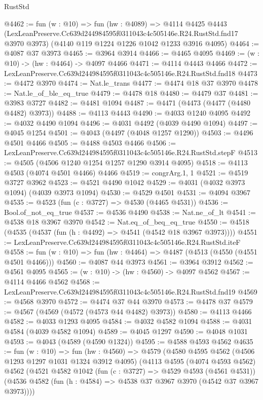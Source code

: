 \begin{lexlean}{RustStd}
\begin{coremodule}
@4462 := fun (w : @10) =>
  fun (hw : @4089) =>
  @4114
    @4425
    @4443
    (LexLeanPreserve.Cc639d244984595f0311043c4c505146e.R24.RustStd.fnd17 @3970 @3973)
    (@4140 @119 @1224 @1226 @1042 @1233 @3916 @4095)
@4464 := @4087 @37 @3973
@4465 := @3964 @3914
@4466 := @4465 @4095
@4469 := (w : @10) -> (hw : @4464) -> @4097 @4466
@4471 := @4114 @4443 @4466
@4472 := LexLeanPreserve.Cc639d244984595f0311043c4c505146e.R24.RustStd.fnd18
@4473 := @4472 @3970
@4474 := Nat.le_trans
@4477 := @4474 @18 @37 @3970
@4478 := Nat.le_of_ble_eq_true
@4479 := @4478 @18
@4480 := @4479 @37
@4481 := @3983 @3727
@4482 := @4481 @1094
@4487 := @4471 (@4473 (@4477 (@4480 @4482) @3973))
@4488 := @4113 @4443
@4490 := @4033 @1240 @4095
@4492 := @4032 @4490 @1094
@4496 := @4031 @4492 (@4039 @4490 @1094)
@4497 := @4045 @1254
@4501 := @4043 (@4497 (@4048 @1257 @1290))
@4503 := @4496 @4501 @4466
@4505 := @4488 @4503 @4466
@4506 := LexLeanPreserve.Cc639d244984595f0311043c4c505146e.R24.RustStd.stepF
@4513 := @4505 (@4506 @1240 @1254 @1257 @1290 @3914 @4095)
@4518 := @4113 @4503 (@4074 @4501 @4466) @4466
@4519 := congrArg.{1, 1}
@4521 := @4519 @3727 @3962
@4523 := @4521 @4490 @1042
@4529 := @4031 (@4032 @3973 @1094) (@4039 @3973 @1094)
@4530 := @4529 @4501
@4531 := @4094 @3967
@4535 := @4523 (fun (c : @3727) => @4530 (@4465 @4531))
@4536 := Bool.of_not_eq_true
@4537 := @4536 @4490
@4538 := Nat.ne_of_lt
@4541 := @4538 @18 @3967 @3970
@4542 := Nat.eq_of_beq_eq_true
@4550 := @4518 (@4535 (@4537 (fun (h : @4492) => @4541 (@4542 @18 @3967 @3973))))
@4551 := LexLeanPreserve.Cc639d244984595f0311043c4c505146e.R24.RustStd.iteF
@4558 := fun (w : @10) => fun (hw : @4464) => @4487 (@4513 (@4550 (@4551 @4501 @4466)))
@4560 := @4087 @44 @3973
@4561 := @3964 @3912
@4562 := @4561 @4095
@4565 := (w : @10) -> (hw : @4560) -> @4097 @4562
@4567 := @4114 @4466 @4562
@4568 := LexLeanPreserve.Cc639d244984595f0311043c4c505146e.R24.RustStd.fnd19
@4569 := @4568 @3970
@4572 := @4474 @37 @44 @3970
@4573 := @4478 @37
@4579 := @4567 (@4569 (@4572 (@4573 @44 @4482) @3973))
@4580 := @4113 @4466
@4582 := @4033 @1293 @4095
@4584 := @4032 @4582 @1094
@4588 := @4031 @4584 (@4039 @4582 @1094)
@4589 := @4045 @1297
@4590 := @4048 @1031
@4593 := @4043 (@4589 (@4590 @1324))
@4595 := @4588 @4593 @4562
@4635 := fun (w : @10) =>
  fun (hw : @4560) =>
  @4579
    (@4580
      @4595
      @4562
      (@4506 @1293 @1297 @1031 @1324 @3912 @4095)
      (@4113
        @4595
        (@4074 @4593 @4562)
        @4562
        (@4521
          @4582
          @1042
          (fun (c : @3727) => @4529 @4593 (@4561 @4531))
          (@4536 @4582 (fun (h : @4584) => @4538 @37 @3967 @3970 (@4542 @37 @3967 @3973))))

\end{coremodule}
\end{lexlean}
